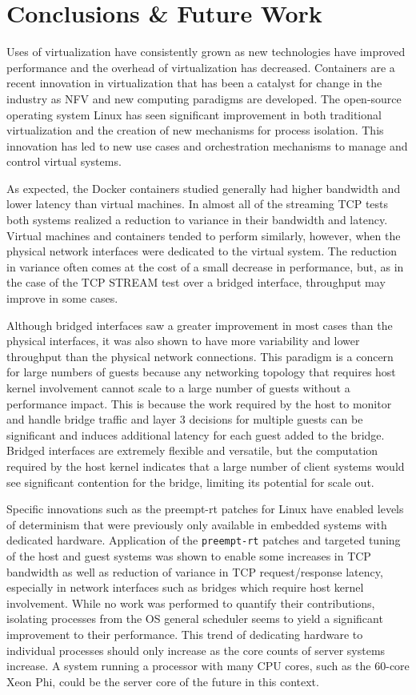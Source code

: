 \chapter{Conclusions \& Future Work}
\label{sec:conclusions}
Uses of virtualization have consistently grown as new technologies have improved performance and the overhead of virtualization has decreased.  
Containers are a recent innovation in virtualization that has been a catalyst for change in the industry as NFV and new computing paradigms are developed.
The open-source operating system Linux has seen significant improvement in both traditional virtualization and the creation of new mechanisms for process isolation.  
This innovation has led to new use cases and orchestration mechanisms to manage and control virtual systems.

As expected, the Docker containers studied generally had higher bandwidth and lower latency than virtual machines.
In almost all of the streaming TCP tests both systems realized a reduction to variance in their bandwidth and latency.
Virtual machines and containers tended to perform similarly, however, when the physical network interfaces were dedicated to the virtual system.
The reduction in variance often comes at the cost of a small decrease in performance, but, as in the case of the TCP STREAM test over a bridged interface, throughput may improve in some cases.

Although bridged interfaces saw a greater improvement in most cases than the physical interfaces, it was also shown to have more variability and lower throughput than the physical network connections.  
This paradigm is a concern for large numbers of guests because any networking topology that requires host kernel involvement cannot scale to a large number of guests without a performance impact.
This is because the work required by the host to monitor and handle bridge traffic and layer 3 decisions for multiple guests can be significant and induces additional latency for each guest added to the bridge.    
Bridged interfaces are extremely flexible and versatile, but the computation required by the host kernel indicates that a large number of client systems would see significant contention for the bridge, limiting its potential for scale out.

Specific innovations such as the preempt-rt patches for Linux have enabled levels of determinism that were previously only available in embedded systems with dedicated hardware.  
Application of the \texttt{preempt-rt} patches and targeted tuning of the host and guest systems was shown to enable some increases in TCP bandwidth as well as reduction of variance in TCP request/response latency, especially in network interfaces such as bridges which require host kernel involvement.   
While no work was performed to quantify their contributions, isolating processes from the OS general scheduler seems to yield a significant improvement to their performance.
This trend of dedicating hardware to individual processes should only increase as the core counts of server systems increase.
A system running a processor with many CPU cores, such as the 60-core Xeon Phi, could be the server core of the future in this context.

